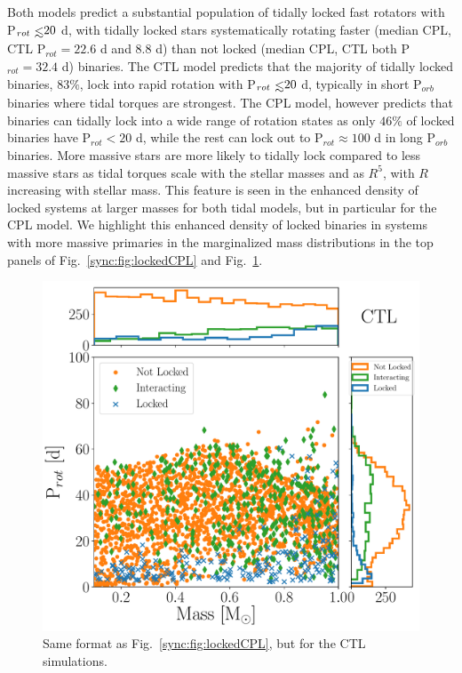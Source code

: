Both models predict a substantial population of tidally locked fast rotators with P$_{rot} \lsim 20$ d, with tidally locked stars systematically rotating faster (median CPL, CTL P$_{rot} = 22.6$ d and $8.8$ d) than not locked (median CPL, CTL both P$_{rot} = 32.4$ d) binaries. The CTL model predicts that the majority of tidally locked binaries, $83\%$, lock into rapid rotation with P$_{rot} \lsim 20$ d, typically in short P$_{orb}$ binaries where tidal torques are strongest. The CPL model, however predicts that binaries can tidally lock into a wide range of rotation states as only $46\%$ of locked binaries have P$_{rot} < 20$ d, while the rest can lock out to P$_{rot} \approx 100$ d in long P$_{orb}$ binaries. More massive stars are more likely to tidally lock compared to less massive stars as tidal torques scale with the stellar masses and as $R^5$, with $R$ increasing with stellar mass.  This feature is seen in the enhanced density of locked systems at larger masses for both tidal models, but in particular for the CPL model. We highlight this enhanced density of locked binaries in systems with more massive primaries in the marginalized mass distributions in the top panels of Fig.~\ref{sync:fig:lockedCPL} and Fig.~\ref{sync:fig:lockedCTL}.

\begin{figure}
	\includegraphics[width=\columnwidth]{lockedCTL.pdf}
   \caption{Same format as Fig.~\ref{sync:fig:lockedCPL}, but for the CTL simulations.}%
    \label{sync:fig:lockedCTL}%
\end{figure}

